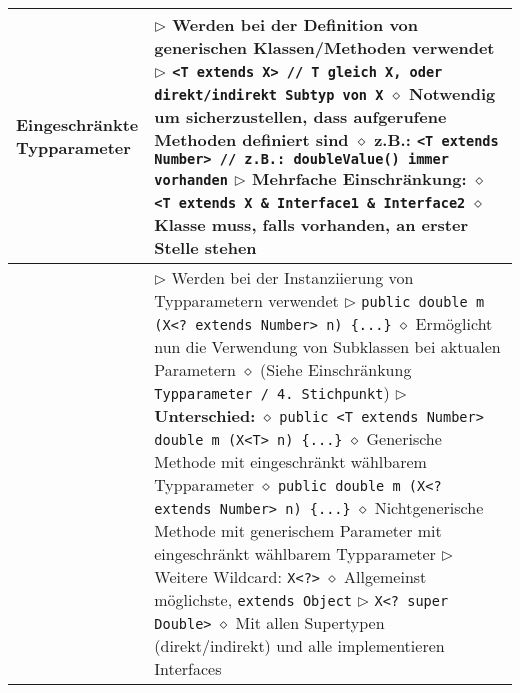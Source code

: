 \begin{longtable}{ | p{4cm} p{13.5cm} | }
	\makecell[l]{Eingeschränkte \\ Typparameter} & \makecell[l]{$\rhd$ Werden bei der Definition von generischen Klassen/Methoden verwendet \\
	$\rhd$ \texttt{<T extends X> // T gleich X, oder direkt/indirekt Subtyp von X} \\
	\hspace{0.4cm} $\diamond$ Notwendig um sicherzustellen, dass aufgerufene Methoden definiert sind \\
	\hspace{0.4cm} $\diamond$ z.B.: \texttt{<T extends Number> // z.B.: doubleValue() immer vorhanden} \\
	$\rhd$ Mehrfache Einschränkung:  \\
	\hspace{0.4cm} $\diamond$ \texttt{<T extends X \& Interface1 \& Interface2} \\
	\hspace{0.4cm} $\diamond$ Klasse muss, falls vorhanden, an erster Stelle stehen} \\ \hline

	\makecell[l]{Wildcards} & \makecell[l]{$\rhd$ Werden bei der Instanziierung von Typparametern verwendet \\
	$\rhd$ \texttt{public double m (X<? extends Number> n) \{...\}} \\
	\hspace{0.4cm} $\diamond$ Ermöglicht nun die Verwendung von Subklassen bei aktualen Parametern \\
	\hspace{0.4cm} $\diamond$ (Siehe Einschränkung \texttt{Typparameter / 4. Stichpunkt}) \\
	$\rhd$ \textbf{Unterschied:} \\
	\hspace{0.4cm} $\diamond$ \texttt{public <T extends Number> double m (X<T> n) \{...\}} \\
	\hspace{0.6cm} $\diamond$ Generische Methode mit eingeschränkt wählbarem Typparameter \\
	\hspace{0.4cm} $\diamond$ \texttt{public double m (X<? extends Number> n) \{...\}} \\
	\hspace{0.6cm} $\diamond$ Nichtgenerische Methode mit generischem Parameter mit eingeschränkt \\
	\hspace{1cm} wählbarem Typparameter \\
	$\rhd$ Weitere Wildcard: \texttt{X<?>} \\
	\hspace{0.4cm} $\diamond$ Allgemeinst möglichste, \texttt{extends Object} \\
	$\rhd$ \texttt{X<? super Double>} \\
	\hspace{0.4cm} $\diamond$ Mit allen Supertypen (direkt/indirekt) und alle implementieren Interfaces} \\ \hline


\end{longtable}
